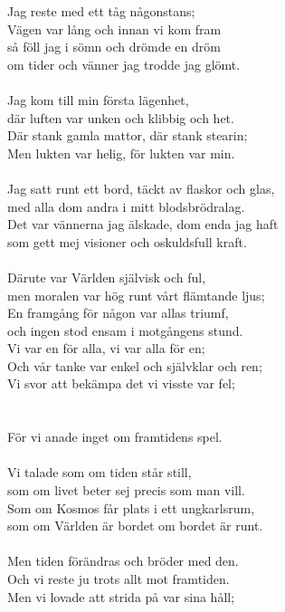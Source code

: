 \vspace{10pt}
Jag reste med ett tåg någonstans;\\
Vägen var lång och innan vi kom fram\\
så föll jag i sömn och drömde en dröm\\
om tider och vänner jag trodde jag glömt.\\
\\
Jag kom till min första lägenhet,\\
där luften var unken och klibbig och het.\\
Där stank gamla mattor, där stank stearin;\\
Men lukten var helig, för lukten var min.\\
\\
Jag satt runt ett bord, täckt av flaskor och glas,\\
med alla dom andra i mitt blodsbrödralag.\\
Det var vännerna jag älskade, dom enda jag haft\\
som gett mej visioner och oskuldsfull kraft.\\
\\
Därute var Världen självisk och ful,\\
men moralen var hög runt vårt flämtande ljus;\\
En framgång för någon var allas triumf,\\
och ingen stod ensam i motgångens stund.\\
Vi var en för alla, vi var alla för en;\\
Och vår tanke var enkel och självklar och ren;\\
Vi svor att bekämpa det vi visste var fel;\\
\\
\\
För vi anade inget om framtidens spel.\\
\\
Vi talade som om tiden står still,\\
som om livet beter sej precis som man vill.\\
Som om Kosmos får plats i ett ungkarlsrum,\\
som om Världen är bordet om bordet är runt.\\
\\
Men tiden förändras och bröder med den.\\
Och vi reste ju trots allt mot framtiden.\\
Men vi lovade att strida på var sina håll;\\
